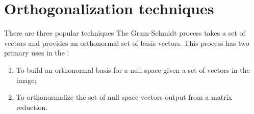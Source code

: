 \chapter{Orthogonalization techniques}
\label{sec:ortho}

There are three popular techniques
The Gram-Schmidt process takes a set of vectors and provides an orthonormal set of basis vectors. This process has two primary uses in the \svdp:
\begin{enumerate}
\item To build an orthonormal basis for a null space given a set of vectors in the image;
\item To orthonormalize the set of null space vectors output from a matrix reduction.
\end{enumerate}


\endinput
